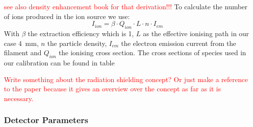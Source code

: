 		\textcolor{red}{see also density enhancement book for that derivation!!!}
		To calculate the number of ions produced in the ion source we use:
		\begin{equation}
		I_{ion} = \beta\cdot Q_{ion}\cdot L\cdot n\cdot I_{em}
		\end{equation}
		With $\beta$ the extraction efficiency which is 1, %
		$L$ as the effective ionising path in our case 4~\si{\milli\metre}, $n$ the particle density, $I_{em}$ the electron emission current from the filament and $Q_{ion}$ the ionising cross section. The cross sections of species used in our calibration can be found in table %
		
		\textcolor{red}{Write something about the radiation shielding concept? Or just make a reference to the paper because it gives an overview over the concept as far as it is necessary.}
		
		\subsubsection{Detector Parameters} %
		
